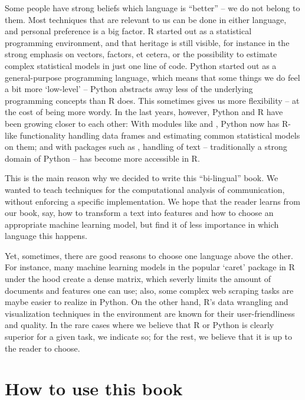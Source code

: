 Some people have strong beliefs which language is ``better'' -- we do
not belong to them. Most techniques that are relevant to us can be
done in either language, and personal preference is a big factor. R
started out as a statistical programming environment, and that
heritage is still visible, for instance in the strong emphasis on
vectors, factors, et cetera, or the possibility to estimate complex
statistical models in just one line of code. Python started out as a
general-purpose programming language, which means that some things we
do feel a bit more `low-level' -- Python abstracts away less of the
underlying programming concepts than R does. This sometimes gives us
more flexibility -- at the cost of being more wordy.
In the last years, however, Python and R have been
growing closer to each other: With modules like  and
, Python now has R-like functionality handling data
frames and estimating common statistical models on them; and with
packages such as , handling of text -- traditionally a
strong domain of Python -- has become more accessible in R.

This is the main reason why we decided to write this ``bi-lingual''
book. We wanted to teach techniques for the computational analysis of
communication, without enforcing a specific implementation. We hope
that the reader learns from our book, say, how to transform a text
into features and how to choose an appropriate machine learning model,
but find it of less importance in which language this happens.

Yet, sometimes, there are good reasons to choose one language above
the other. For instance, many machine learning models in the popular `caret' package in R under the
hood create a dense matrix, which severly limits the amount of
documents and features one can use; also, some complex web scraping
tasks are maybe easier to realize in Python. On the other hand, R's
data wrangling and visualization techniques in the 
environment are known for their user-friendliness and quality.  In the
rare cases where we believe that R or Python is clearly superior for a
given task, we indicate so; for the rest, we believe that it is up to
the reader to choose.


\section{How to use this book}

